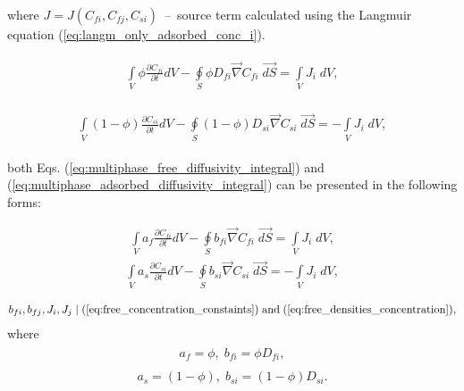 \documentclass[a4paper,14pt,english]{extreport}
\begin{document}
where $J=J\left(C_{fi}, C_{fj}, C_{si} \right)$~--~source term calculated using the Langmuir equation (\ref{eq:langm_only_adsorbed_conc_i}).

\begin{eqnarray}
\begin{gathered}
\label{eq:multiphase_free_diffusivity_integral}
\int \limits_{V} \phi \frac{\partial C_{fi}}{\partial t} dV  - \oint \limits_{S} \phi D_{fi} \vec{\nabla}C_{fi} \; \vec{dS} = \int \limits_{V} J_i \; dV,
\end{gathered}
\end{eqnarray}

\begin{eqnarray}
\begin{gathered}
\label{eq:multiphase_adsorbed_diffusivity_integral}
\int \limits_{V} \left(\mathit{1}-\phi\right) \frac{\partial C_{si}}{\partial t} dV - \oint \limits_{S} \left(\mathit{1}-\phi\right) D_{si} \vec{\nabla}C_{si} \; \vec{dS} = -\int \limits_{V}J_i \; dV,
\end{gathered}
\end{eqnarray}

both Eqs. (\ref{eq:multiphase_free_diffusivity_integral}) and (\ref{eq:multiphase_adsorbed_diffusivity_integral}) can be presented in the following forms:

\begin{eqnarray}
\label{eq:multiphase_diffusivity_simplified_integral_1}
\int \limits_{V} a_{f} \frac{\partial C_{fi}}{\partial t} dV - \oint \limits_{S} b_{fi} \vec{\nabla}C_{fi} \; \vec{dS} = \int \limits_{V} J_{i} \; dV,
\end{eqnarray}
\begin{eqnarray}
\label{eq:multiphase_diffusivity_simplified_integral_2}
\int \limits_{V} a_{s} \frac{\partial C_{si}}{\partial t} dV - \oint \limits_{S} b_{si} \vec{\nabla}C_{si} \; \vec{dS} = -\int \limits_{V} J_{i} \; dV,
\end{eqnarray}

\begin{eqnarray}
\label{eq:multiphase_diffusivity_densities}
b_{fi}, b_{fj}, J_{i}, J_{j} \mid (\ref{eq:free_concentration_constaints}) \; \text{and} \; (\ref{eq:free_densities_concentration}),
\end{eqnarray}
where
\begin{eqnarray}
\label{eq:multiphase_diffusivity_a_b_coeffs_free}
\begin{gathered}
a_{f} = \phi, \; b_{fi} = \phi D_{fi},
\end{gathered}
\end{eqnarray}
\begin{eqnarray}
\label{eq:multiphase_diffusivity_a_b_coeffs_adsorbed}
\begin{gathered}
a_{s} = \left(\mathit{1}-\phi\right), \; b_{si} = \left(\mathit{1}-\phi\right) D_{si}.
\end{gathered}
\end{eqnarray}
\end{document}
